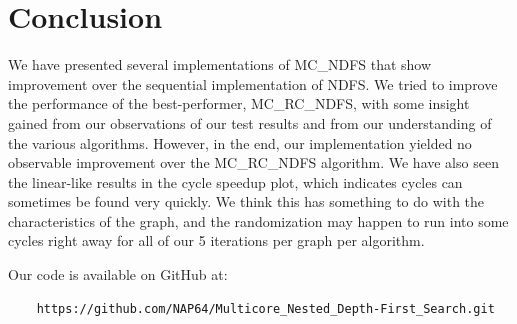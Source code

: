 \documentclass[a4paper]{article}
\begin{document}
\section{Conclusion}\label{conclusion}

We have presented several implementations of MC\_NDFS that show improvement over the sequential implementation of NDFS. We tried to improve the performance of the best-performer, MC\_RC\_NDFS, with some insight gained from our observations of our test results and from our understanding of the various algorithms. However, in the end, our implementation yielded no observable improvement over the MC\_RC\_NDFS algorithm. We have also seen the linear-like results in the cycle speedup plot, which indicates cycles can sometimes be found very quickly. We think this has something to do with the characteristics of the graph, and the randomization may happen to run into some cycles right away for all of our 5 iterations per graph per algorithm.

Our code is available on GitHub at:

\begin{verbatim}
    https://github.com/NAP64/Multicore_Nested_Depth-First_Search.git
\end{verbatim}





\end{document}
